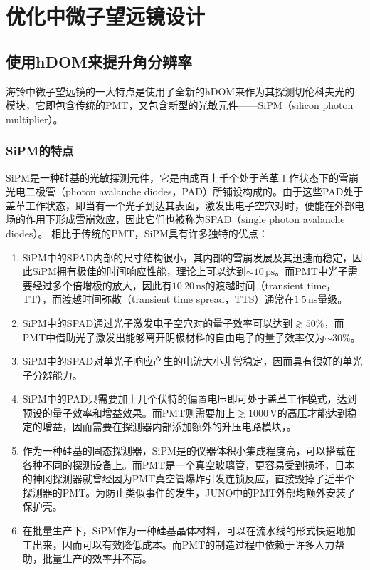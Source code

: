 \chapter{优化中微子望远镜设计}
\label{chap:telescope_design}

\section{使用hDOM来提升角分辨率}
\label{sec:hdom}

海铃中微子望远镜的一大特点是使用了全新的hDOM\cite{hDOM:2021}来作为其探测切伦科夫光的模块，它即包含传统的PMT，又包含新型的光敏元件——SiPM（silicon photon multiplier）。

\subsection{SiPM的特点}

SiPM是一种硅基的光敏探测元件，它是由成百上千个处于盖革工作状态下的雪崩光电二极管（photon avalanche diodes，PAD）所铺设构成的\cite{understanding_sipm:2019}。由于这些PAD处于盖革工作状态，即当有一个光子到达其表面，激发出电子空穴对时，便能在外部电场的作用下形成雪崩效应，因此它们也被称为SPAD（single photon avalanche diodes）。
相比于传统的PMT，SiPM具有许多独特的优点：
\begin{enumerate}
    \item SiPM中的SPAD内部的尺寸结构很小，其内部的雪崩发展及其迅速而稳定，因此SiPM拥有极佳的时间响应性能，理论上可以达到$\sim 10\,\mathrm{ps}$。而PMT中光子需要经过多个倍增极的放大，因此有$10 ~ 20\,\mathrm{ns}$的渡越时间（transient time，TT），而渡越时间弥散（transient time spread，TTS）通常在$1~5\,\mathrm{ns}$量级。
    \item SiPM中的SPAD通过光子激发电子空穴对的量子效率可以达到$\gtrsim 50 \%$，而PMT中借助光子激发出能够离开阴极材料的自由电子的量子效率仅为$\sim 30\%$。
    \item SiPM中的SPAD对单光子响应产生的电流大小非常稳定，因而具有很好的单光子分辨能力。
    \item SiPM中的PAD只需要加上几个伏特的偏置电压即可处于盖革工作模式，达到预设的量子效率和增益效果。而PMT则需要加上$\gtrsim 1000 \,\mathrm{V}$的高压才能达到稳定的增益，因而需要在探测器内部添加额外的升压电路模块，。
    \item 作为一种硅基的固态探测器，SiPM是的仪器体积小集成程度高，可以搭载在各种不同的探测设备上。而PMT是一个真空玻璃管，更容易受到损坏，日本的神冈探测器就曾经因为PMT真空管爆炸引发连锁反应，直接毁掉了近半个探测器的PMT。为防止类似事件的发生，JUNO中的PMT外部均额外安装了保护壳\cite{JUNO_pmt_implosion:2022}。
    \item 在批量生产下，SiPM作为一种硅基晶体材料，可以在流水线的形式快速地加工出来，因而可以有效降低成本。而PMT的制造过程中依赖于许多人力帮助，批量生产的效率并不高。
\end{enumerate}

